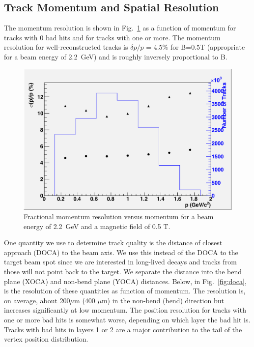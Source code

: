 \subsection{Track Momentum and Spatial Resolution}

The momentum resolution is shown in Fig.~\ref{fig:trkmom} as a function of momentum for tracks with 
0 bad hits and for tracks with one or more.  The momentum resolution for well-reconstructed 
tracks is $\delta p/p$ = 4.5\% for B=0.5T (appropriate for a beam energy of 2.2~GeV) and is roughly inversely proportional to B.  


\begin{figure}
\includegraphics[scale=0.8]{performance/tracking_performance/pz2pt2GeV-MomRes-Tracks.pdf}
\caption{  Fractional momentum resolution versus momentum for a beam energy of 2.2~GeV and a magnetic field of 0.5 T. } 
\label{fig:trkmom}
\end{figure}


One quantity we use to determine track quality is the distance of closest approach (DOCA) 
to the beam axis.  We use this instead of the DOCA to the target beam spot since we are 
interested in long-lived decays and tracks from those will not point back to the target. 
We separate the distance into the bend plane (XOCA) and non-bend plane (YOCA) distances.  
Below, in Fig.~\ref{fig:doca}, is the resolution of these quantities as function of momentum.  
The resolution is, on average, about 200$\mu$m (400 $\mu$m) 
in the non-bend (bend) direction but increases significantly at low momentum.  The position 
resolution for tracks with one or more bad hits is somewhat worse, depending on which layer 
the bad hit is.  Tracks with bad hits in 
layers 1 or 2 are a major contribution to the tail of the vertex position distribution. 
    
